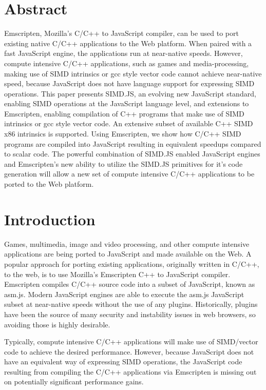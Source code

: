 \documentclass[preprint]{sigplanconf}
\begin{document}
\section{Abstract}
Emscripten, Mozilla's C/C++ to JavaScript compiler, can be used to port
existing native C/C++ applications to the Web platform.  When paired with
a fast JavaScript engine, the applications run at near-native speeds.
However, compute intensive C/C++ applications, such as games and 
media-processing, making use of SIMD intrinsics or gcc style vector code 
cannot achieve near-native speed, because JavaScript does not have 
language support for expressing SIMD operations.
This paper presents SIMD.JS, an evolving new JavaScript standard, 
enabling SIMD operations at the JavaScript language level, and extensions 
to Emscripten, enabling compilation of C++ programs that make use of 
SIMD intrinsics or gcc style vector code.  An extensive subset of 
available C++ SIMD x86 intrinsics is supported.
Using Emscripten, we show how C/C++ SIMD programs are compiled into 
JavaScript resulting in equivalent speedups compared to scalar code.  
The powerful combination of SIMD.JS enabled JavaScript engines and 
Emscripten's new ability to utilize the SIMD.JS primitives for it's 
code generation will allow a new set of compute intensive C/C++ 
applications to be ported to the Web  platform.

\section{Introduction}

Games, multimedia, image and video processing, and other compute intensive
applications are being ported to JavaScript and made available on the Web.
A popular approach for porting existing applications, originally written in C/C++,
to the web, is to use Mozilla's Emscripten C++ to JavaScript compiler. Emscripten
compiles C/C++ source code into a subset of JavaScript, known as asm.js.
Modern JavaScript engines are able to execute the asm.js JavaScript subset
at near-native speeds without the use of any plugins.  Historically, plugins have
been the source of many security and instability issues in web browsers, so
avoiding those is highly desirable.

Typically, compute intensive C/C++ applications will make use of SIMD/vector
code to achieve the desired performance. However, because JavaScript does not have an equivalent
way of expressing SIMD operations, the JavaScript code resulting from 
compiling the C/C++ applications via Emscripten is missing out on potentially 
significant performance gains.
\end{document}
